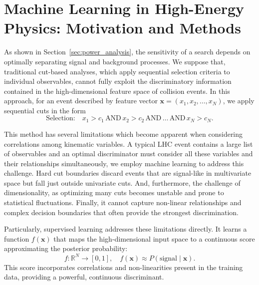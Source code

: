 \section{Machine Learning in High-Energy Physics: Motivation and Methods}
\label{sec:machine_learning}

As shown in Section~\ref{sec:power_analysis}, the sensitivity of a search depends on optimally separating signal and background processes. We suppose that, traditional cut-based analyses, which apply sequential selection criteria to individual observables, cannot fully exploit the discriminatory information contained in the high-dimensional feature space of collision events. In this approach, for an event described by feature vector $\mathbf{x} = (x_1, x_2, \ldots, x_N)$, we apply sequential cuts in the form
\begin{equation}
\text{Selection:} \quad x_1 > c_1 \,\text{AND}\, x_2 > c_2 \,\text{AND}\, \ldots \,\text{AND}\, x_N > c_N.
\end{equation}

This method has several limitations which become apparent when considering correlations among kinematic variables. A typical LHC event contains a large list of observables and an optimal discriminator must consider all these variables and their relationships simultaneously, we employ machine learning to address this challenge. Hard cut boundaries discard events that are signal-like in multivariate space but fall just outside univariate cuts. And, furthermore, the challenge of dimensionality, as optimizing many cuts becomes unstable and prone to statistical fluctuations. Finally, it cannot capture non-linear relationships and complex decision boundaries that often provide the strongest discrimination.

Particularly, supervised learning addresses these limitations directly. It learns a function $f(\mathbf{x})$ that maps the high-dimensional input space to a continuous score approximating the posterior probability:
\begin{equation}
f: \mathbb{R}^N \rightarrow [0,1], \quad f(\mathbf{x}) \approx P(\text{signal} \mid \mathbf{x}).
\end{equation}
This score incorporates correlations and non-linearities present in the training data, providing a powerful, continuous discriminant.

